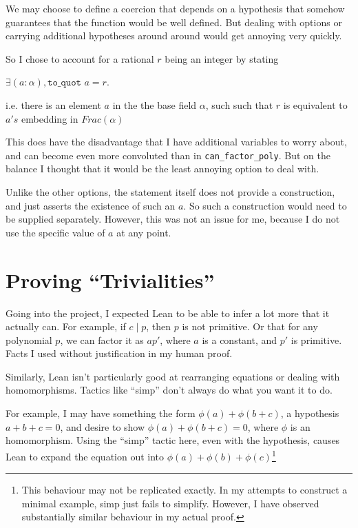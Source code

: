 \documentclass[pagesize=a4]{scrreprt}
\begin{document}
    We may choose to define a coercion that depends on a hypothesis that somehow guarantees that the function would be well defined.   But dealing with options or carrying additional hypotheses around around would get annoying very quickly.

    So I chose to account for a rational $r$ being an integer by stating 

    $\exists(a : \alpha), \texttt{to\_quot } a = r$. 

    i.e. there is an element $a$ in the the base field $\alpha$, such such that $r$ is equivalent to $a's$ embedding in $Frac(\alpha)$

    This does have the disadvantage that I have additional variables to worry about, and can become even more convoluted than in \texttt{can\_factor\_poly}. But on the balance I thought that it would be the least annoying option to deal with. 

    Unlike the other options, the statement itself does not provide a construction, and just asserts the existence of such an $a$. So such a construction would need to be supplied separately. However, this was not an issue for me, because I do not use the specific value of $a$ at any point. 

\section{Proving ``Trivialities''}

Going into the project, I expected Lean to be able to infer a lot more that it actually can. For example, if $c \mid p$, then $p$ is not primitive. Or that for any polynomial $p$, we can factor it as $ap'$, where $a$ is a constant, and $p'$ is primitive. Facts I used without justification in my human proof.  

Similarly, Lean isn't particularly good at rearranging equations or dealing with homomorphisms. Tactics like ``simp'' don't always do what you want it to do. 

For example, I may have something the form $\phi(a) + \phi(b + c)$, a hypothesis $a + b + c = 0$, and desire to show $\phi(a) + \phi(b+c) = 0$, where $\phi$ is an homomorphism. Using the ``simp'' tactic here, even with the hypothesis, causes Lean to expand the equation out into $\phi(a) + \phi(b) + \phi(c)$\footnote{This behaviour may not be replicated exactly. In my attempts to construct a minimal example, simp just fails to simplify. However, I have observed substantially similar behaviour in my actual proof.}
\end{document}
